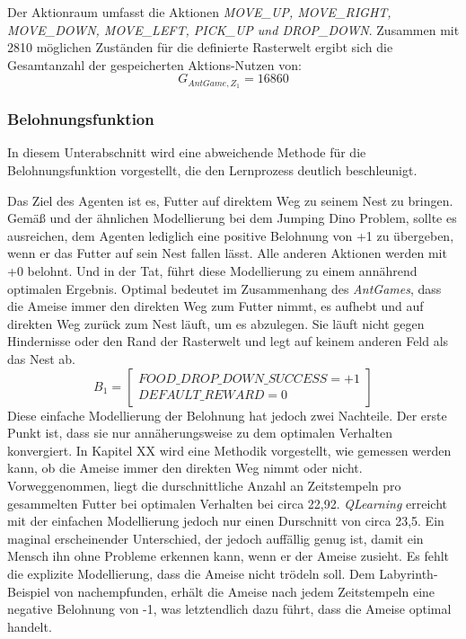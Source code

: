 Der Aktionraum umfasst die Aktionen \textit{MOVE\_UP, MOVE\_RIGHT,
MOVE\_DOWN,
MOVE\_LEFT,
PICK\_UP und
DROP\_DOWN}. Zusammen mit 2810 möglichen Zuständen für die definierte Rasterwelt ergibt sich die Gesamtanzahl der gespeicherten Aktions-Nutzen von:
\begin{equation}
    G_{AntGame,Z_1} = 16860
\end{equation}

\subsubsection{Belohnungsfunktion}
In diesem Unterabschnitt wird eine abweichende Methode für die Belohnungsfunktion vorgestellt, die den Lernprozess deutlich beschleunigt.
\par
Das Ziel des Agenten ist es, Futter auf direktem Weg zu seinem Nest zu bringen. Gemäß \cite{Sutton1998} und der ähnlichen Modellierung bei dem Jumping Dino Problem, sollte es ausreichen, dem Agenten lediglich eine positive Belohnung von +1 zu übergeben, wenn er das Futter auf sein Nest fallen lässt. Alle anderen Aktionen werden mit +0 belohnt. Und in der Tat, führt diese Modellierung zu einem annährend optimalen Ergebnis. \glqq Optimal\grqq{} bedeutet im Zusammenhang des \textit{AntGames}, dass die Ameise immer den direkten Weg zum Futter nimmt, es aufhebt und auf direkten Weg zurück zum Nest läuft, um es abzulegen. Sie läuft nicht gegen Hindernisse oder den Rand der Rasterwelt und legt auf keinem anderen Feld als das Nest ab.
\begin{equation}
    B_{1} =  \begin{bmatrix} 
        FOOD\_DROP\_DOWN\_SUCCESS = +1\\
        DEFAULT\_REWARD = 0           
 \end{bmatrix}
\end{equation}
Diese einfache Modellierung der Belohnung hat jedoch zwei Nachteile. Der erste Punkt ist, dass sie nur annäherungsweise zu dem optimalen Verhalten konvergiert. In Kapitel XX wird eine Methodik vorgestellt, wie gemessen werden kann, ob die Ameise immer den direkten Weg nimmt oder nicht. Vorweggenommen, liegt die durschnittliche Anzahl an Zeitstempeln pro gesammelten Futter bei optimalen Verhalten bei circa 22,92. \textit{QLearning} erreicht mit der einfachen Modellierung jedoch nur einen Durschnitt von circa 23,5. Ein maginal erscheinender Unterschied, der jedoch auffällig genug ist, damit ein Mensch ihn ohne Probleme erkennen kann, wenn er der Ameise zusieht. Es fehlt die explizite Modellierung, dass die Ameise nicht \glqq trödeln\grqq{} soll. Dem Labyrinth-Beispiel von \cite{Sutton1998} nachempfunden, erhält die Ameise nach jedem Zeitstempeln eine negative Belohnung von -1, was letztendlich dazu führt, dass die Ameise optimal handelt.
